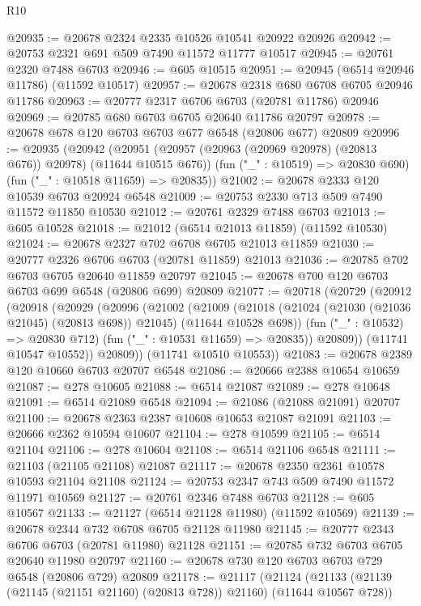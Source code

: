 \begin{lexlean}{R10}
\begin{coremodule}
{{{{{{{{{{{{{{{{{{{{{{{{{{{{{{{{{{{{{{{{{{{{{{{{{{{{{{{{{{{{{{{{{{{{{{{{{{{{{{{{{{{{@20935 := @20678 @2324 @2335 @10526 @10541 @20922 @20926
@20942 := @20753 @2321 @691 @509 @7490 @11572 @11777 @10517
@20945 := @20761 @2320 @7488 @6703
@20946 := @605 @10515
@20951 := @20945 (@6514 @20946 @11786) (@11592 @10517)
@20957 := @20678 @2318 @680 @6708 @6705 @20946 @11786
@20963 := @20777 @2317 @6706 @6703 (@20781 @11786) @20946
@20969 := @20785 @680 @6703 @6705 @20640 @11786 @20797
@20978 := @20678 @678 @120 @6703 @6703 @677 @6548 (@20806 @677) @20809
@20996 := @20935
    (@20942
      (@20951 (@20957 (@20963 (@20969 @20978) (@20813 @676)) @20978) (@11644 @10515 @676))
      (fun ("_" : @10519) => @20830 @690)
      (fun ("_" : @10518 @11659) => @20835))
@21002 := @20678 @2333 @120 @10539 @6703 @20924 @6548
@21009 := @20753 @2330 @713 @509 @7490 @11572 @11850 @10530
@21012 := @20761 @2329 @7488 @6703
@21013 := @605 @10528
@21018 := @21012 (@6514 @21013 @11859) (@11592 @10530)
@21024 := @20678 @2327 @702 @6708 @6705 @21013 @11859
@21030 := @20777 @2326 @6706 @6703 (@20781 @11859) @21013
@21036 := @20785 @702 @6703 @6705 @20640 @11859 @20797
@21045 := @20678 @700 @120 @6703 @6703 @699 @6548 (@20806 @699) @20809
@21077 := @20718
    (@20729
      (@20912
        (@20918
          (@20929
            (@20996
              (@21002
                (@21009
                  (@21018
                    (@21024 (@21030 (@21036 @21045) (@20813 @698)) @21045)
                    (@11644 @10528 @698))
                  (fun ("_" : @10532) => @20830 @712)
                  (fun ("_" : @10531 @11659) => @20835))
                @20809))
            (@11741 @10547 @10552))
          @20809))
      (@11741 @10510 @10553))
@21083 := @20678 @2389 @120 @10660 @6703 @20707 @6548
@21086 := @20666 @2388 @10654 @10659
@21087 := @278 @10605
@21088 := @6514 @21087
@21089 := @278 @10648
@21091 := @6514 @21089 @6548
@21094 := @21086 (@21088 @21091) @20707
@21100 := @20678 @2363 @2387 @10608 @10653 @21087 @21091
@21103 := @20666 @2362 @10594 @10607
@21104 := @278 @10599
@21105 := @6514 @21104
@21106 := @278 @10604
@21108 := @6514 @21106 @6548
@21111 := @21103 (@21105 @21108) @21087
@21117 := @20678 @2350 @2361 @10578 @10593 @21104 @21108
@21124 := @20753 @2347 @743 @509 @7490 @11572 @11971 @10569
@21127 := @20761 @2346 @7488 @6703
@21128 := @605 @10567
@21133 := @21127 (@6514 @21128 @11980) (@11592 @10569)
@21139 := @20678 @2344 @732 @6708 @6705 @21128 @11980
@21145 := @20777 @2343 @6706 @6703 (@20781 @11980) @21128
@21151 := @20785 @732 @6703 @6705 @20640 @11980 @20797
@21160 := @20678 @730 @120 @6703 @6703 @729 @6548 (@20806 @729) @20809
@21178 := @21117
    (@21124
      (@21133 (@21139 (@21145 (@21151 @21160) (@20813 @728)) @21160) (@11644 @10567 @728))
}}}}}}}}}}}}}}}}}}}}}}}}}}}}}}}}}}}}}}}}}}}}}}}}}}}}}}}}}}}}}}}}}}}}}}}}}}}}}}}}}}}}
\end{coremodule}
\end{lexlean}
